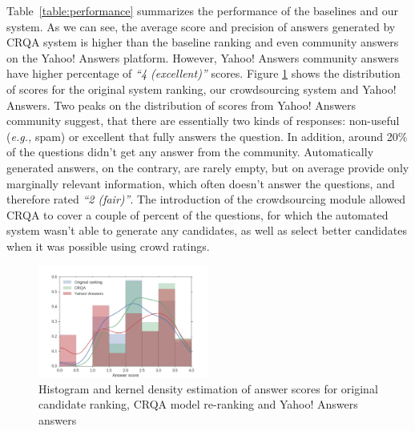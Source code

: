 \documentclass[letterpaper]{article}
\makeatletter
\newcommand{\eg}{\textit{e.g.,}\@\xspace}
\makeatother
\begin{document}
Table~\ref{table:performance} summarizes the performance of the baselines and our system.
As we can see, the average score and precision of answers generated by CRQA system is higher than the baseline ranking and even community answers on the Yahoo! Answers platform.
However, Yahoo! Answers community answers have higher percentage of \textit{``4 (excellent)''} scores.
Figure \ref{fig:score_histogram} shows the distribution of scores for the original system ranking, our crowdsourcing system and Yahoo! Answers.
Two peaks on the distribution of scores from Yahoo! Answers community suggest, that there are essentially two kinds of responses: non-useful (\eg spam) or excellent that fully answers the question.
In addition, around 20\% of the questions didn't get any answer from the community.
Automatically generated answers, on the contrary, are rarely empty, but on average provide only marginally relevant information, which often doesn't answer the questions, and therefore rated \textit{``2 (fair)''}.
The introduction of the crowdsourcing module allowed CRQA to cover a couple of percent of the questions, for which the automated system wasn't able to generate any candidates, as well as select better candidates when it was possible using crowd ratings.

\begin{figure}[h]
	\centering
	\includegraphics[width=0.5\textwidth]{img/score_hist}
	\caption{Histogram and kernel density estimation of answer scores for original candidate ranking, CRQA model re-ranking and Yahoo! Answers answers}
	\label{fig:score_histogram}
\end{figure}
\end{document}
